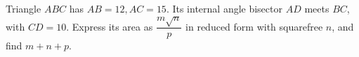 Triangle $ABC$ has $AB=12,AC=15$. Its internal angle bisector $AD$ meets $BC$, with $CD=10$. Express its area as $\dfrac{m\sqrt n}{p}$ in reduced form with squarefree $n$, and find $m+n+p$.
